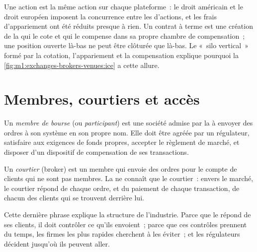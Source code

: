 \begin{remark}\label{rem:m1:exchanges-brokers-venues:silo}
Une action est la même action sur chaque plateforme~: le droit américain et le droit européen
imposent la concurrence entre les  d'actions, et les frais d'appariement ont été réduits
presque à rien. Un contrat à terme est une création de la  qui le cote
et qui le compense dans sa propre chambre de compensation~; une position ouverte là-bas ne peut
être clôturée que là-bas. Le «~silo vertical~» formé par la cotation, l'appariement et la compensation
explique pourquoi la \cref{fig:m1:exchanges-brokers-venues:ice} a cette allure.
\end{remark}

\section{Membres, courtiers et accès}

\begin{definition}\label{def:m1:exchanges-brokers-venues:member}
Un \emph{membre de bourse} (ou \emph{participant}) est une
société admise par la  à envoyer des ordres à son système en son propre nom.
Elle doit être agréée par un régulateur, satisfaire aux exigences de fonds propres, accepter le
règlement de marché, et disposer d'un dispositif de compensation de ses transactions.
\end{definition}

\begin{definition}[Courtier]\label{def:m1:exchanges-brokers-venues:broker}
Un \emph{courtier} (broker) est un membre qui envoie des ordres pour le compte de
clients qui ne sont pas membres. La  ne connaît que le courtier~: envers le marché, le
courtier répond de chaque ordre, et du paiement de chaque
transaction, de chacun des clients qui se trouvent derrière lui.
\end{definition}

Cette dernière phrase explique la structure de l'industrie. Parce que le
 répond de ses clients, il doit contrôler ce qu'ils envoient~; parce que
ces contrôles prennent du temps, les firmes les plus rapides cherchent à les éviter~; et
les régulateurs décident jusqu'où ils peuvent aller.

